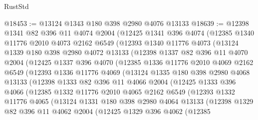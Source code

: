 \begin{lexlean}{RustStd}
\begin{coremodule}
@18453 := @13124 @1343 @180 @398 @2980 @4076 @13133
@18639 := @12398
    @1341
    @82
    @396
    @11
    @4074
    @2004
    (@12425
      @1341
      @396
      @4074
      (@12385
        @1340
        @11776
        @2010
        @4073
        @2162
        @6549
        (@12393
          @1340
          @11776
          @4073
          (@13124
            @1339
            @180
            @398
            @2980
            @4072
            @13133
            (@12398
              @1337
              @82
              @396
              @11
              @4070
              @2004
              (@12425
                @1337
                @396
                @4070
                (@12385
                  @1336
                  @11776
                  @2010
                  @4069
                  @2162
                  @6549
                  (@12393
                    @1336
                    @11776
                    @4069
                    (@13124
                      @1335
                      @180
                      @398
                      @2980
                      @4068
                      @13133
                      (@12398
                        @1333
                        @82
                        @396
                        @11
                        @4066
                        @2004
                        (@12425
                          @1333
                          @396
                          @4066
                          (@12385
                            @1332
                            @11776
                            @2010
                            @4065
                            @2162
                            @6549
                            (@12393
                              @1332
                              @11776
                              @4065
                              (@13124
                                @1331
                                @180
                                @398
                                @2980
                                @4064
                                @13133
                                (@12398
                                  @1329
                                  @82
                                  @396
                                  @11
                                  @4062
                                  @2004
                                  (@12425
                                    @1329
                                    @396
                                    @4062
                                    (@12385

\end{coremodule}
\end{lexlean}
